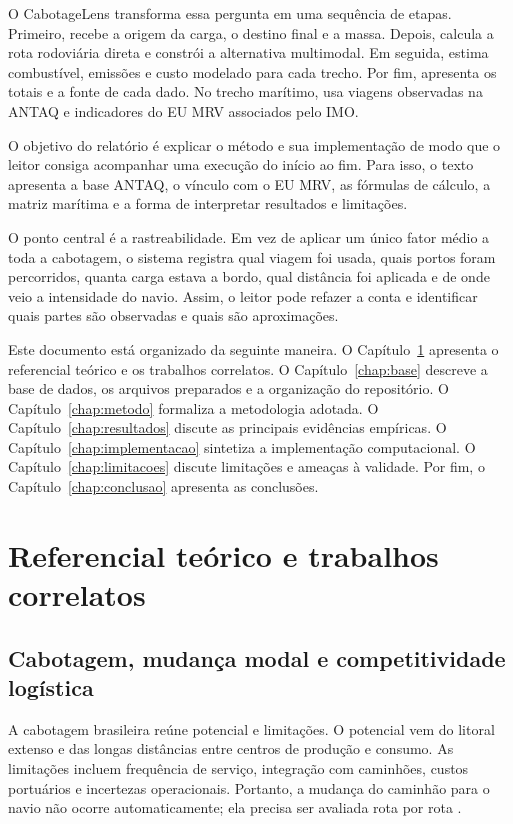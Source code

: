 \documentclass[12pt,a4paper]{report}
\begin{document}
O CabotageLens transforma essa pergunta em uma sequência de etapas. Primeiro, recebe a origem da carga, o destino final e a massa. Depois, calcula a rota rodoviária direta e constrói a alternativa multimodal. Em seguida, estima combustível, emissões e custo modelado para cada trecho. Por fim, apresenta os totais e a fonte de cada dado. No trecho marítimo, usa viagens observadas na ANTAQ e indicadores do EU MRV associados pelo IMO.

O objetivo do relatório é explicar o método e sua implementação de modo que o leitor consiga acompanhar uma execução do início ao fim. Para isso, o texto apresenta a base ANTAQ, o vínculo com o EU MRV, as fórmulas de cálculo, a matriz marítima e a forma de interpretar resultados e limitações.

O ponto central é a rastreabilidade. Em vez de aplicar um único fator médio a toda a cabotagem, o sistema registra qual viagem foi usada, quais portos foram percorridos, quanta carga estava a bordo, qual distância foi aplicada e de onde veio a intensidade do navio. Assim, o leitor pode refazer a conta e identificar quais partes são observadas e quais são aproximações.

Este documento está organizado da seguinte maneira. O Capítulo~\ref{chap:referencial} apresenta o referencial teórico e os trabalhos correlatos. O Capítulo~\ref{chap:base} descreve a base de dados, os arquivos preparados e a organização do repositório. O Capítulo~\ref{chap:metodo} formaliza a metodologia adotada. O Capítulo~\ref{chap:resultados} discute as principais evidências empíricas. O Capítulo~\ref{chap:implementacao} sintetiza a implementação computacional. O Capítulo~\ref{chap:limitacoes} discute limitações e ameaças à validade. Por fim, o Capítulo~\ref{chap:conclusao} apresenta as conclusões.

\chapter{Referencial teórico e trabalhos correlatos}
\label{chap:referencial}

\section{Cabotagem, mudança modal e competitividade logística}

A cabotagem brasileira reúne potencial e limitações. O potencial vem do litoral extenso e das longas distâncias entre centros de produção e consumo. As limitações incluem frequência de serviço, integração com caminhões, custos portuários e incertezas operacionais. Portanto, a mudança do caminhão para o navio não ocorre automaticamente; ela precisa ser avaliada rota por rota \citep{icct2022,users2022}.
\end{document}
